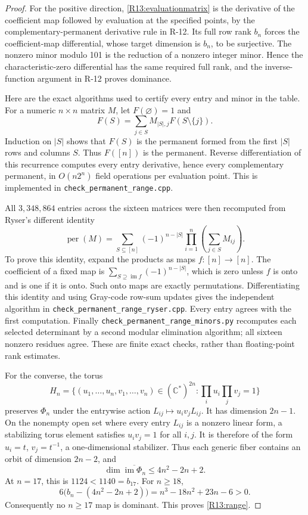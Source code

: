 \begin{proof}
For the positive direction, \eqref{R13:evaluationmatrix} is the
derivative of the coefficient map followed by evaluation at the
specified points, by the complementary-permanent derivative
rule in R-12. Its full row rank $b_n$ forces the coefficient-map
differential, whose target dimension is $b_n$, to be surjective.
The nonzero minor modulo 101 is the reduction of a nonzero
integer minor. Hence the characteristic-zero differential has
the same required full rank, and the inverse-function argument
in R-12 proves dominance.

Here are the exact algorithms used to certify every entry and
minor in the table. For a numeric $n\times n$ matrix $M$, let
$F(\varnothing)=1$ and
\[
 F(S)=\sum_{j\in S}M_{|S|,j}F(S\setminus\{j\}).
\]
Induction on $|S|$ shows that $F(S)$ is the permanent formed from
the first $|S|$ rows and columns $S$. Thus $F([n])$ is the
permanent. Reverse differentiation of this recurrence computes
every entry derivative, hence every complementary permanent,
in $O(n2^n)$ field operations per evaluation point. This is
implemented in \texttt{check\_permanent\_range.cpp}.

All $3{,}348{,}864$ entries across the sixteen matrices were then
recomputed from Ryser's different identity
\[
 \operatorname{per}(M)=
 \sum_{S\subseteq[n]}(-1)^{n-|S|}
 \prod_{i=1}^n\left(\sum_{j\in S}M_{ij}\right).
\]
To prove this identity, expand the products as maps
$f:[n]\to[n]$. The coefficient of a fixed map is
$\sum_{S\supseteq\operatorname{im}f}(-1)^{n-|S|}$, which is zero
unless $f$ is onto and is one if it is onto. Such onto maps are
exactly permutations. Differentiating this identity and using
Gray-code row-sum updates gives the independent algorithm in
\texttt{check\_permanent\_range\_ryser.cpp}. Every entry agrees
with the first computation. Finally
\texttt{check\_permanent\_range\_minors.py} recomputes each
selected determinant by a second modular elimination algorithm;
all sixteen nonzero residues agree. These are finite exact
checks, rather than floating-point rank estimates.

For the converse, the torus
\[
 H_n=\{(u_1,\ldots,u_n,v_1,\ldots,v_n)\in(\mathbb C^*)^{2n}:
                  \prod_i u_i\prod_j v_j=1\}
\]
preserves $\Phi_n$ under the entrywise action
$L_{ij}\mapsto u_i v_jL_{ij}$. It has dimension $2n-1$.
On the nonempty open set where every entry $L_{ij}$ is a nonzero
linear form, a stabilizing torus element satisfies
$u_i v_j=1$ for all $i,j$. It is therefore of the form
$u_i=t$, $v_j=t^{-1}$, a one-dimensional stabilizer.
Thus each generic fiber contains an orbit of dimension $2n-2$,
and
\begin{equation}\label{R13:dimension}
 \dim\overline{\operatorname{im}\Phi_n}
       \leq4n^2-2n+2.
\end{equation}
At $n=17$, this is $1124<1140=b_{17}$. For $n\geq18$,
\[
 6\bigl(b_n-(4n^2-2n+2)\bigr)
 =n^3-18n^2+23n-6>0.
\]
Consequently no $n\geq17$ map is dominant. This proves
\eqref{R13:range}.


\end{proof}
